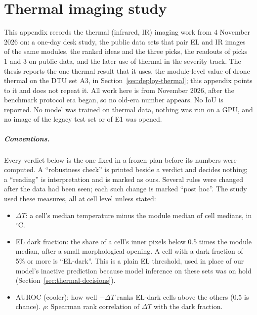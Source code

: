 \chapter{Thermal imaging study}\label{app:thermal}

This appendix records the thermal (infrared, IR) imaging work from 4 November 2026 on: a one-day desk study, the public data
sets that pair EL and IR images of the same modules, the ranked ideas and the three picks, the readouts of picks 1 and 3 on
public data, and the later use of thermal in the severity track. The thesis reports the one thermal result that it uses, the
module-level value of drone thermal on the DTU set A3, in Section~\ref{sec:deploy-thermal}; this appendix points to it and does not
repeat it. All work here is from November 2026, after the benchmark protocol era began, so no old-era number appears. No IoU is
reported. No model was trained on thermal data, nothing was run on a GPU, and no image of the legacy test set or of E1 was opened.

\paragraph{Conventions.} Every verdict below is the one fixed in a frozen plan before its numbers were computed. A ``robustness
check'' is printed beside a verdict and decides nothing; a ``reading'' is interpretation and is marked as ours. Several rules were
changed after the data had been seen; each such change is marked ``post hoc''. The study used these measures, all at cell level unless
stated:
\begin{itemize}
\item $\Delta T$: a cell's median temperature minus the module median of cell medians, in $^{\circ}$C.
\item EL dark fraction: the share of a cell's inner pixels below 0.5 times the module median, after a small morphological opening.
A cell with a dark fraction of 5\% or more is ``EL-dark''. This is a plain EL threshold, used in place of our model's inactive
prediction because model inference on these sets was on hold (Section~\ref{sec:thermal-decisions}).
\item AUROC (cooler): how well $-\Delta T$ ranks EL-dark cells above the others (0.5 is chance). $\rho$: Spearman rank correlation of
$\Delta T$ with the dark fraction.
\end{itemize}


